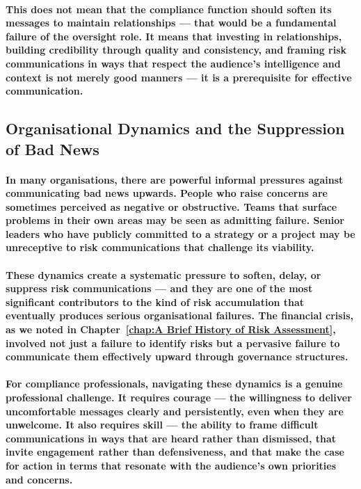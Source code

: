 \paragraph{This does not mean that the compliance function should soften its messages to maintain relationships — that would be a fundamental failure of the oversight role. It means that investing in relationships, building credibility through quality and consistency, and framing risk communications in ways that respect the audience's intelligence and context is not merely good manners — it is a prerequisite for effective communication.}

\subsection{Organisational Dynamics and the Suppression of Bad News}
\paragraph{In many organisations, there are powerful informal pressures against communicating bad news upwards. People who raise concerns are sometimes perceived as negative or obstructive. Teams that surface problems in their own areas may be seen as admitting failure. Senior leaders who have publicly committed to a strategy or a project may be unreceptive to risk communications that challenge its viability.}
\paragraph{These dynamics create a systematic pressure to soften, delay, or suppress risk communications — and they are one of the most significant contributors to the kind of risk accumulation that eventually produces serious organisational failures. The financial crisis, as we noted in Chapter~\ref{chap:A Brief History of Risk Assessment}, involved not just a failure to identify risks but a pervasive failure to communicate them effectively upward through governance structures.}
\paragraph{For compliance professionals, navigating these dynamics is a genuine professional challenge. It requires courage — the willingness to deliver uncomfortable messages clearly and persistently, even when they are unwelcome. It also requires skill — the ability to frame difficult communications in ways that are heard rather than dismissed, that invite engagement rather than defensiveness, and that make the case for action in terms that resonate with the audience's own priorities and concerns.}


